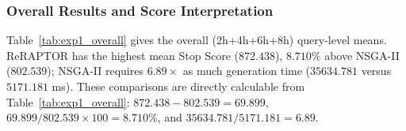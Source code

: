 \subsubsection{Overall Results and Score Interpretation}
Table~\ref{tab:exp1_overall} gives the overall (2h+4h+6h+8h) query-level means.
ReRAPTOR has the highest mean Stop Score (\(872.438\)), \(8.710\%\) above
NSGA-II (\(802.539\)); NSGA-II requires \(6.89\times\) as much generation time
(\(35634.781\) versus \(5171.181\) ms). These comparisons are directly calculable from
Table~\ref{tab:exp1_overall}: \(872.438-802.539=69.899\),
\(69.899/802.539\times100=8.710\%\), and
\(35634.781/5171.181=6.89\).

\begin{table}[t]
    \centering
    \caption{Experiment 1 summary (120 query-level means). Generation is solver
    wall time; Rank averages within-query ranks (score descending, then time).}
    \label{tab:exp1_overall}
\end{table}


